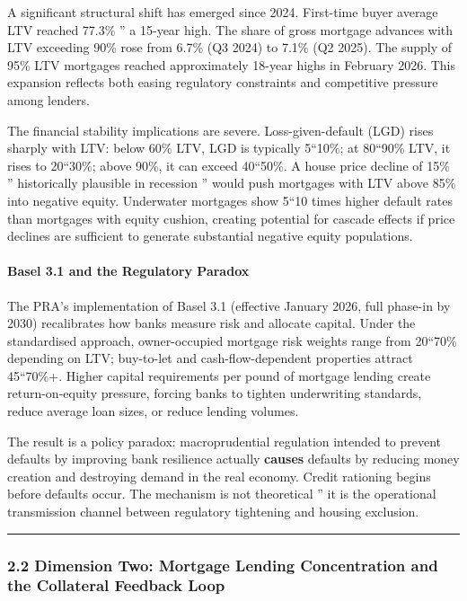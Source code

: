 \documentclass[
]{article}
\begin{document}
A significant structural shift has emerged since 2024. First-time buyer
average LTV reached 77.3\% '' a 15-year high. The share of gross
mortgage advances with LTV exceeding 90\% rose from 6.7\% (Q3 2024) to
7.1\% (Q2 2025). The supply of 95\% LTV mortgages reached approximately
18-year highs in February 2026. This expansion reflects both easing
regulatory constraints and competitive pressure among lenders.

The financial stability implications are severe. Loss-given-default
(LGD) rises sharply with LTV: below 60\% LTV, LGD is typically 5``10\%;
at 80``90\% LTV, it rises to 20``30\%; above 90\%, it can exceed
40``50\%. A house price decline of 15\% '' historically plausible in
recession '' would push mortgages with LTV above 85\% into negative
equity. Underwater mortgages show 5``10 times higher default rates than
mortgages with equity cushion, creating potential for cascade effects if
price declines are sufficient to generate substantial negative equity
populations.

\paragraph{Basel 3.1 and the Regulatory
Paradox}\label{basel-3.1-and-the-regulatory-paradox}

The PRA's implementation of Basel 3.1 (effective January 2026, full
phase-in by 2030) recalibrates how banks measure risk and allocate
capital. Under the standardised approach, owner-occupied mortgage risk
weights range from 20``70\% depending on LTV; buy-to-let and
cash-flow-dependent properties attract 45``70\%+. Higher capital
requirements per pound of mortgage lending create return-on-equity
pressure, forcing banks to tighten underwriting standards, reduce
average loan sizes, or reduce lending volumes.

The result is a policy paradox: macroprudential regulation intended to
prevent defaults by improving bank resilience actually \textbf{causes}
defaults by reducing money creation and destroying demand in the real
economy. Credit rationing begins before defaults occur. The mechanism is
not theoretical '' it is the operational transmission channel between
regulatory tightening and housing exclusion.

\begin{center}\rule{0.5\linewidth}{0.5pt}\end{center}

\subsubsection{2.2 Dimension Two: Mortgage Lending Concentration and the
Collateral Feedback
Loop}\label{dimension-two-mortgage-lending-concentration-and-the-collateral-feedback-loop}
\end{document}
